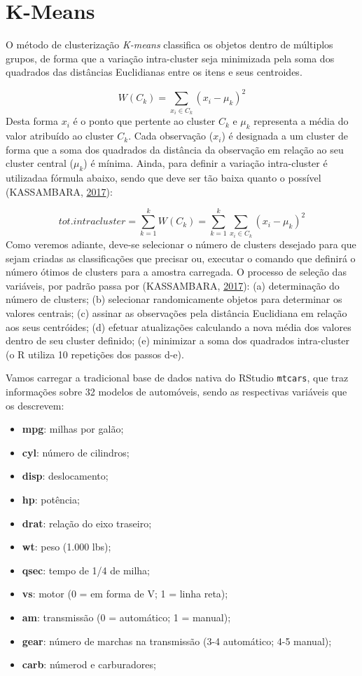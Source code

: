 \documentclass[12pt,brazil,oneside]{book}
\providecommand{\tightlist}{%
  \setlength{\itemsep}{0pt}\setlength{\parskip}{0pt}}
\begin{document}
\hypertarget{k-means}{%
\section{K-Means}\label{k-means}}

O método de clusterização \emph{K-means} classifica os objetos dentro de múltiplos grupos, de forma que a variação intra-cluster seja minimizada pela soma dos quadrados das distâncias Euclidianas entre os itens e seus centroides.

\[
W(C_k)=\sum _{x_i\in C_k}(x_i-\mu _k)^2
\]
Desta forma \(x_i\) é o ponto que pertente ao cluster \(C_k\) e \(\mu _k\) representa a média do valor atribuído ao cluster \(C_k\). Cada observação (\(x_i\)) é designada a um cluster de forma que a soma dos quadrados da distância da observação em relação ao seu cluster central (\(\mu _k\)) é mínima. Ainda, para definir a variação intra-cluster é utilizadaa fórmula abaixo, sendo que deve ser tão baixa quanto o possível (KASSAMBARA, \protect\hyperlink{ref-Kassambara2017}{2017}):

\[
tot.intracluster=\sum_{k=1}^{k} W(C_k)=\sum_{k=1}^{k}\sum _{x_i\in C_k}(x_i-\mu _k)^2
\]
Como veremos adiante, deve-se selecionar o número de clusters desejado para que sejam criadas as classificações que precisar ou, executar o comando que definirá o número ótimos de clusters para a amostra carregada. O processo de seleção das variáveis, por padrão passa por (KASSAMBARA, \protect\hyperlink{ref-Kassambara2017}{2017}): (a) determinação do número de clusters; (b) selecionar randomicamente objetos para determinar os valores centrais; (c) assinar as observações pela distância Euclidiana em relação aos seus centróides; (d) efetuar atualizações calculando a nova média dos valores dentro de seu cluster definido; (e) minimizar a soma dos quadrados intra-cluster (o R utiliza 10 repetições dos passos d-e).

Vamos carregar a tradicional base de dados nativa do RStudio \texttt{mtcars}, que traz informações sobre 32 modelos de automóveis, sendo as respectivas variáveis que os descrevem:

\begin{itemize}
\tightlist
\item
  \textbf{mpg}: milhas por galão;
\item
  \textbf{cyl}: número de cilindros;
\item
  \textbf{disp}: deslocamento;
\item
  \textbf{hp}: potência;
\item
  \textbf{drat}: relação do eixo traseiro;
\item
  \textbf{wt}: peso (1.000 lbs);
\item
  \textbf{qsec}: tempo de 1/4 de milha;
\item
  \textbf{vs}: motor (0 = em forma de V; 1 = linha reta);
\item
  \textbf{am}: transmissão (0 = automático; 1 = manual);
\item
  \textbf{gear}: número de marchas na transmissão (3-4 automático; 4-5 manual);
\item
  \textbf{carb}: númerod e carburadores;
\end{itemize}
\end{document}
